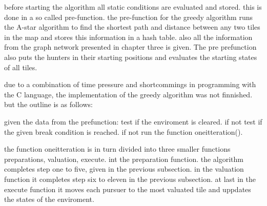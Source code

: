 before starting the algorithm all static conditions are evaluated and stored. this is done in a so called pre-function. the pre-function for the greedy algorithm runs the A-star algorithm to find the shortest path and distance between any two tiles in the map and stores this information in a hash table. also all the information from the graph network presented in chapter three is given. The pre prefunction also puts the hunters in their starting positions and evaluates the starting states of all tiles.

due to a combination of time pressure and shortcommings in programming with the C language, the implementation of the greedy algorithm was not finnished. but the outline is as follows:

given the data from the prefunction:
test if the enviroment is cleared. if not
test if the given break condition is reached. if not
run the function oneitteration().
 
the function oneitteration is in turn divided into three smaller functions preparations, valuation, execute.
int the preparation function. the algorithm  completes step one to five, given in the previous subsection.
in the valuation function it completes step six to eleven in the previous subsection.
at last in the execute function it moves each pursuer to the most valuated tile and uppdates the states of the enviroment.


